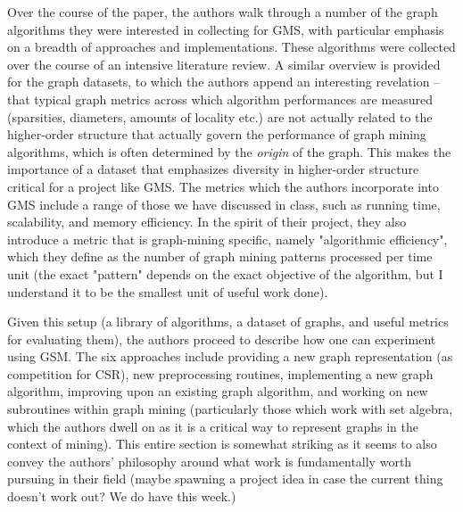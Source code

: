 Over the course of the paper, the authors walk through a number of the graph algorithms they were interested in collecting for GMS, with particular emphasis on a breadth of approaches and implementations. These algorithms were collected over the course of an intensive literature review. A similar overview is provided for the graph datasets, to which the authors append an interesting revelation -- that typical graph metrics across which algorithm performances are measured (sparsities, diameters, amounts of locality etc.) are not actually related to the higher-order structure that actually govern the performance of graph mining algorithms, which is often determined by the \textit{origin} of the graph. This makes the importance of a dataset that emphasizes diversity in higher-order structure critical for a project like GMS. The metrics which the authors incorporate into GMS include a range of those we have discussed in class, such as running time, scalability, and memory efficiency. In the spirit of their project, they also introduce a metric that is graph-mining specific, namely "algorithmic efficiency", which they define as the number of graph mining patterns processed per time unit (the exact "pattern" depends on the exact objective of the algorithm, but I understand it to be the smallest unit of useful work done).

Given this setup (a library of algorithms, a dataset of graphs, and useful metrics for evaluating them), the authors proceed to describe how one can experiment using GSM. The six approaches include providing a new graph representation (as competition for CSR), new preprocessing routines, implementing a new graph algorithm, improving upon an existing graph algorithm, and working on new subroutines within graph mining (particularly those which work with set algebra, which the authors dwell on as it is a critical way to represent graphs in the context of mining). This entire section is somewhat striking as it seems to also convey the authors' philosophy around what work is fundamentally worth pursuing in their field (maybe spawning a project idea in case the current thing doesn't work out? We do have this week.)

